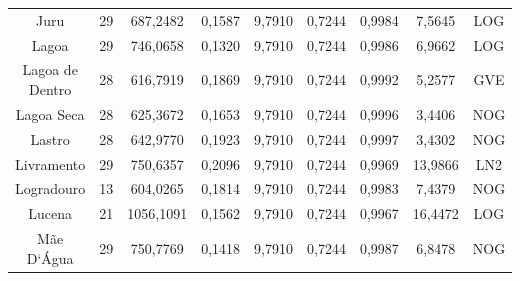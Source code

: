 \begin{table}[ht]
\begin{tabular}{ccccccccc}
Juru & 29 & 687,2482 & 0,1587 & 9,7910 & 0,7244 & 0,9984 & 7,5645 & LOG \\
Lagoa & 29 & 746,0658 & 0,1320 & 9,7910 & 0,7244 & 0,9986 & 6,9662 & LOG \\
Lagoa de Dentro & 28 & 616,7919 & 0,1869 & 9,7910 & 0,7244 & 0,9992 & 5,2577 & GVE \\
Lagoa Seca & 28 & 625,3672 & 0,1653 & 9,7910 & 0,7244 & 0,9996 & 3,4406 & NOG \\
Lastro & 28 & 642,9770 & 0,1923 & 9,7910 & 0,7244 & 0,9997 & 3,4302 & NOG \\
Livramento & 29 & 750,6357 & 0,2096 & 9,7910 & 0,7244 & 0,9969 & 13,9866 & LN2 \\
Logradouro & 13 & 604,0265 & 0,1814 & 9,7910 & 0,7244 & 0,9983 & 7,4379 & NOG \\
Lucena & 21 & 1056,1091 & 0,1562 & 9,7910 & 0,7244 & 0,9967 & 16,4472 & LOG \\
Mãe D`Água & 29 & 750,7769 & 0,1418 & 9,7910 & 0,7244 & 0,9987 & 6,8478 & NOG \\ \hline
\end{tabular}
\end{table}

\newpage


